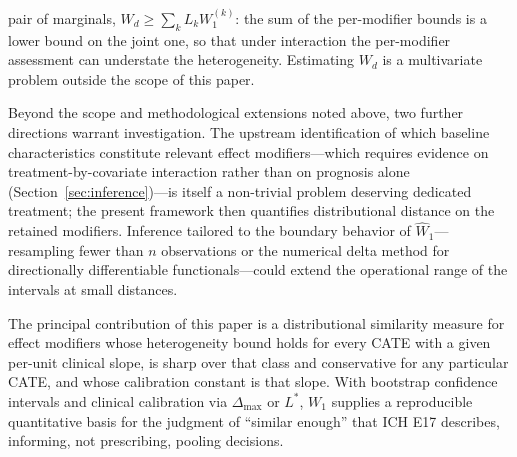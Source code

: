 \documentclass[AMA,Times1COL]{WileyNJDv5}
\begin{document}
pair of marginals, $W_d \geq \sum_k L_k W_1^{(k)}$: the sum of the per-modifier bounds is a lower bound on the joint one, so that under interaction the per-modifier assessment can understate the heterogeneity. Estimating $W_d$ is a multivariate problem outside the scope of this paper.

Beyond the scope and methodological extensions noted above, two further directions warrant investigation. The upstream identification of which baseline characteristics constitute relevant effect modifiers---which requires evidence on treatment-by-covariate interaction rather than on prognosis alone (Section~\ref{sec:inference})---is itself a non-trivial problem deserving dedicated treatment; the present framework then quantifies distributional distance on the retained modifiers. Inference tailored to the boundary behavior of $\widehat{W}_1$---resampling fewer than $n$ observations\cite{bickel1997} or the numerical delta method for directionally differentiable functionals\cite{hong2018}---could extend the operational range of the intervals at small distances.

The principal contribution of this paper is a distributional similarity measure for effect modifiers whose heterogeneity bound holds for every CATE with a given per-unit clinical slope, is sharp over that class and conservative for any particular CATE, and whose calibration constant is that slope. With bootstrap confidence intervals and clinical calibration via $\Delta_{\max}$ or $L^*$, $W_1$ supplies a reproducible quantitative basis for the judgment of ``similar enough'' that ICH E17 describes, informing, not prescribing, pooling decisions.
\end{document}
